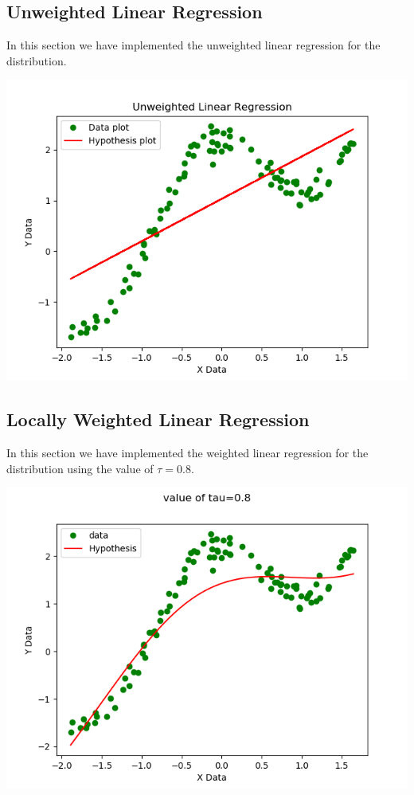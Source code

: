 \documentclass[10pt]{article}
\begin{document}
\subsection{Unweighted Linear Regression}
In this section we have implemented the unweighted linear regression for the distribution.
\begin{center}
\includegraphics[scale=0.8]{wlinearplot.png} 
\end{center}
\newpage
\subsection{Locally Weighted Linear Regression}
In this section we have implemented the weighted linear regression for the distribution using the value of $\tau=0.8$.
  
\begin{center}
\includegraphics[scale=0.8]{weightedt08.png} 
\end{center} 
\newpage
\end{document}
